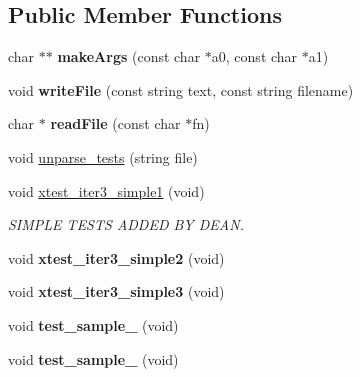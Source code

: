 \subsection*{Public Member Functions}
\begin{DoxyCompactItemize}
\item 
\hypertarget{classAstTestSuite_a2f0462e7a965acda10e09e70432cab40}{char $\ast$$\ast$ {\bfseries make\-Args} (const char $\ast$a0, const char $\ast$a1)}\label{classAstTestSuite_a2f0462e7a965acda10e09e70432cab40}

\item 
\hypertarget{classAstTestSuite_ab935b3c95647b24b5f250b7e3332a313}{void {\bfseries write\-File} (const string text, const string filename)}\label{classAstTestSuite_ab935b3c95647b24b5f250b7e3332a313}

\item 
\hypertarget{classAstTestSuite_afb1462e2494b011f0e5077a567e0ba3d}{char $\ast$ {\bfseries read\-File} (const char $\ast$fn)}\label{classAstTestSuite_afb1462e2494b011f0e5077a567e0ba3d}

\item 
void \hyperlink{classAstTestSuite_a1fb6dcbf82548632381eb89079b456aa}{unparse\-\_\-tests} (string file)
\item 
void \hyperlink{classAstTestSuite_a3d75ff50ddf8e97bd5ad96751dc0df5b}{xtest\-\_\-iter3\-\_\-simple1} (void)
\begin{DoxyCompactList}\small\item\em S\-I\-M\-P\-L\-E T\-E\-S\-T\-S A\-D\-D\-E\-D B\-Y D\-E\-A\-N. \end{DoxyCompactList}\item 
\hypertarget{classAstTestSuite_a9fb3d77a673b94cf2788624cba9ba004}{void {\bfseries xtest\-\_\-iter3\-\_\-simple2} (void)}\label{classAstTestSuite_a9fb3d77a673b94cf2788624cba9ba004}

\item 
\hypertarget{classAstTestSuite_a8d893b852eee4ae321357a240171857e}{void {\bfseries xtest\-\_\-iter3\-\_\-simple3} (void)}\label{classAstTestSuite_a8d893b852eee4ae321357a240171857e}

\item 
\hypertarget{classAstTestSuite_ade48304a65cbc7449bd22ec9097b6a8c}{void {\bfseries test\-\_\-sample\-\_} (void)}\label{classAstTestSuite_ade48304a65cbc7449bd22ec9097b6a8c}

\item 
\hypertarget{classAstTestSuite_af764267aa9a94610fd5307ae81107312}{void {\bfseries test\-\_\-sample\-\_} (void)}\label{classAstTestSuite_af764267aa9a94610fd5307ae81107312}


\end{DoxyCompactItemize}
